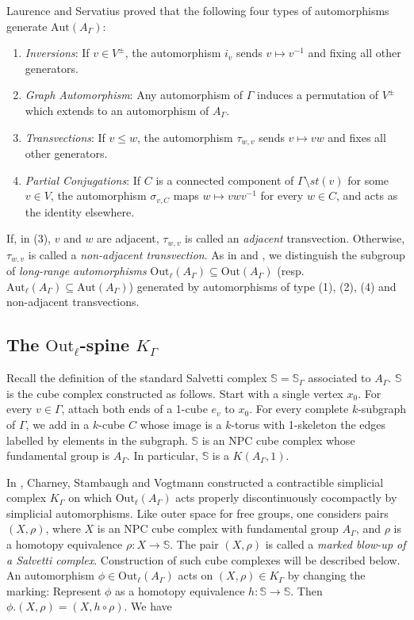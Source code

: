 \documentclass[11pt]{amsart}
\numberwithin{thm}{section}
\theoremstyle{remark}
\theoremstyle{definition}
\newcommand{\Sa}{\mathbb{S}}
\newcommand{\Aut}{\text{Aut}}
\newcommand{\Out}{\text{Out}}
\begin{document}
Laurence \cite{Lau95} and Servatius \cite{Ser89} proved that the following four types of automorphisms generate $\Aut(A_\Gamma)$:
\begin{enumerate}
\item \emph{Inversions}: If $v\in V^{\pm}$, the automorphism $i_v$ sends $v\mapsto v^{-1}$ and fixing all other generators.  
\item \emph{Graph Automorphism}: Any automorphism of $\Gamma$ induces a permutation of $V^{\pm}$ which extends to an automorphism of $A_\Gamma$.
\item \emph{Transvections}: If $v\leq w$, the automorphism $\tau_{w,v}$ sends $v\mapsto vw$ and fixes all other generators. 
\item \emph{Partial Conjugations}: If $C$ is a connected component of $\Gamma\setminus st(v)$ for some $v\in V$, the automorphism $\sigma_{v,C}$ maps $w\mapsto vwv^{-1}$ for every $w\in C$, and acts as the identity elsewhere.  
\end{enumerate}

If, in (3), $v$ and $w$ are adjacent, $\tau_{w,v}$ is called an \emph{adjacent} transvection.  Otherwise, $\tau_{w,v}$ is called a \emph{non-adjacent transvection}. As in \cite{Day09} and \cite{CSV12}, we distinguish the subgroup of \emph{long-range automorphisms} $\Out_{\ell}(A_\Gamma)\subseteq \Out(A_\Gamma)$ (resp. $\Aut_{\ell}(A_\Gamma)\subseteq \Aut(A_\Gamma)$)  generated by automorphisms of type (1), (2), (4) and non-adjacent transvections.  

\subsection{The $\Out_{\ell}$-spine $K_\Gamma$}
Recall the definition of the standard Salvetti complex $\Sa=\Sa_\Gamma$ associated to $A_\Gamma$.  $\Sa$ is the cube complex constructed as follows. Start with a single vertex $x_0$. For every $v\in \Gamma$, attach both ends of a 1-cube $e_v$ to $x_0$.  For every complete $k$-subgraph of $\Gamma$, we add in a $k$-cube $C$ whose image is a $k$-torus with 1-skeleton the edges labelled by elements in the subgraph.  $\Sa$ is an NPC cube complex whose fundamental group is $A_\Gamma$.  In particular, $\Sa$ is a $K(A_\Gamma,1)$.  

In \cite{CSV12}, Charney, Stambaugh and Vogtmann constructed a contractible simplicial complex $K_\Gamma$ on which $\Out_{\ell}(A_\Gamma)$ acts properly discontinuously cocompactly by simplicial automorphisms.  Like outer space for free groups, one considers pairs $(X,\rho)$, where $X$ is an NPC cube complex with fundamental group $A_\Gamma$, and $\rho$ is a homotopy equivalence $\rho:X\rightarrow \Sa$.   The pair $(X,\rho)$ is called a \emph{marked blow-up of a Salvetti complex}.  Construction of such cube complexes will be described below.   An automorphism $\phi\in \Out_{\ell}(A_\Gamma)$ acts on $(X,\rho)\in K_\Gamma$ by changing the marking: Represent $\phi$ as a homotopy equivalence $h:\Sa\rightarrow\Sa$.  Then $\phi.(X,\rho)=(X,h\circ\rho)$.   We have 
\end{document}
